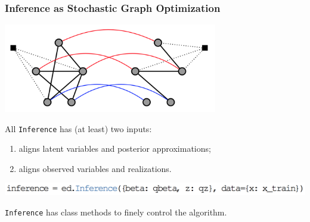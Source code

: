 \documentclass[10pt,
               xcolor={usenames,dvipsnames},
               hyperref={colorlinks,linktoc=all,citecolor=Plum,linkcolor=MidnightBlue,urlcolor=MidnightBlue},noamssymb]{beamer}
\begin{document}

\begin{frame}
\frametitle{Inference as Stochastic Graph Optimization}

\begin{center}
\includegraphics[width=0.7\textwidth]{img/inference-graph.png}
\end{center}

All \texttt{Inference} has (at least) two inputs: \\
\begin{enumerate}
\vspace{-3ex}
\item
{} aligns latent variables and posterior approximations;
\item
{} aligns observed variables and realizations.
\end{enumerate}

\begin{center}
\vspace{-2.0ex}
\includegraphics[height=0.05\textheight]{img/inference.png}
\end{center}

\texttt{Inference} has class methods to finely control the algorithm.
\end{frame}
\end{document}
